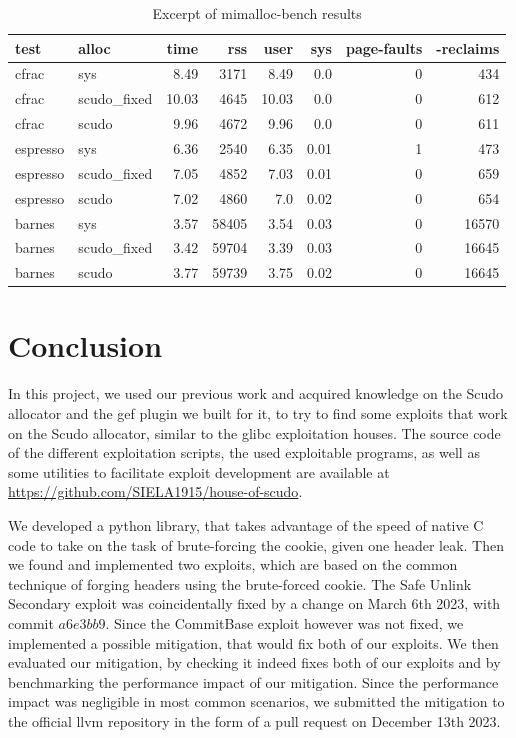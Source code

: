 \documentclass[a4paper,11pt,oneside]{report}
\begin{document}
\begin{longtable}[h]{l l r r r r r r}
  \caption{Excerpt of mimalloc-bench results}\label{tab:MimallocBench} \\

  \toprule
  test & alloc & time & rss & user & sys & page-faults & -reclaims \\
  \midrule
  \endhead{}
  cfrac & sys & 8.49 & 3171 & 8.49 & 0.0 & 0 & 434 \\
  \midrule
  cfrac & scudo\_fixed & 10.03 & 4645 & 10.03 & 0.0 & 0 & 612 \\
  \midrule
  cfrac & scudo & 9.96 & 4672 & 9.96 & 0.0 & 0 & 611 \\
  \midrule
  espresso & sys & 6.36 & 2540 & 6.35 & 0.01 & 1 & 473 \\
  \midrule
  espresso & scudo\_fixed & 7.05 & 4852 & 7.03 & 0.01 & 0 & 659 \\
  \midrule
  espresso & scudo & 7.02 & 4860 & 7.0 & 0.02 & 0 & 654 \\
  \midrule
  barnes & sys & 3.57 & 58405 & 3.54 & 0.03 & 0 & 16570 \\
  \midrule
  barnes & scudo\_fixed & 3.42 & 59704 & 3.39 & 0.03 & 0 & 16645 \\
  \midrule
  barnes & scudo & 3.77 & 59739 & 3.75 & 0.02 & 0 & 16645 \\
  \bottomrule
\end{longtable}


\chapter{Conclusion}

In this project, we used our previous work and acquired knowledge on the Scudo allocator
and the gef plugin we built for it, to try to find some exploits that work on the Scudo
allocator, similar to the glibc exploitation houses. The source code of the different
exploitation scripts, the used exploitable programs, as well as some utilities to
facilitate exploit development are available at
\url{https://github.com/SIELA1915/house-of-scudo}.

We developed a python library, that takes advantage of the speed of native C code to take
on the task of brute-forcing the cookie, given one header leak. Then we found and
implemented two exploits, which are based on the common technique of forging headers using
the brute-forced cookie.
The Safe Unlink Secondary exploit was coincidentally fixed by a change on March 6th 2023,
with commit $a6e3bb9$. Since the CommitBase exploit however was not fixed, we implemented
a possible mitigation, that would fix both of our exploits. We then evaluated our
mitigation, by checking it indeed fixes both of our exploits and by benchmarking the
performance impact of our mitigation. Since the performance impact was negligible in most
common scenarios, we submitted the mitigation to the official llvm repository in the form
of a pull request on December 13th 2023.
\end{document}
